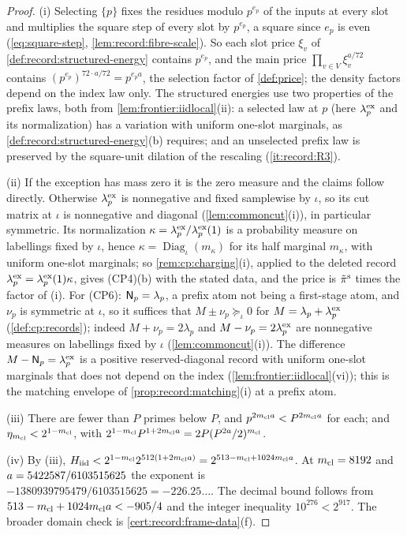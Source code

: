 \begin{proof}
(i) Selecting $\{p\}$ fixes the residues modulo $p^{e_p}$ of the inputs at every
slot and multiplies the square step of every slot by $p^{e_p}$, a square since
$e_p$ is even (\eqref{eq:square-step}, \cref{lem:record:fibre-scale}). So each slot
price $\xi_v$ of \cref{def:record:structured-energy} contains $p^{e_p}$, and the
main price $\prod_{v\in V}\xi_v^{a/72}$ contains $(p^{e_p})^{72\cdot a/72}=p^{e_pa}$,
the selection factor of \cref{def:price}; the density factors depend on the
index law only. The structured energies use two properties of the prefix
laws, both from \cref{lem:frontier:iidlocal}(ii): a selected law at $p$ (here
$\lambda^{\rm ex}_p$ and its normalization) has a variation with uniform
one-slot marginals, as \cref{def:record:structured-energy}(b) requires; and an
unselected prefix law is preserved by the square-unit dilation of the
rescaling (\ref{it:record:R3}).

(ii) If the exception has mass zero it is the zero measure and the claims
follow directly. Otherwise $\lambda^{\rm ex}_p$ is nonnegative and fixed samplewise by $\iota$, so its
cut matrix at $\iota$ is nonnegative and diagonal (\cref{lem:commoncut}(i)), in
particular symmetric. Its normalization
$\kappa=\lambda^{\rm ex}_p/\lambda^{\rm ex}_p(1)$ is a probability measure on
labellings fixed by $\iota$, hence $\kappa=\operatorname{Diag}_\iota(m_\kappa)$
for its half marginal $m_\kappa$, with uniform one-slot marginals; so
\cref{rem:cp:charging}(i), applied to the deleted record
$\lambda^{\rm ex}_p=\lambda^{\rm ex}_p(1)\kappa$, gives (CP4)(b) with the stated
data, and the price is $\tilde\pi^{\rm s}$ times the factor of (i). For (CP6):
$\mathsf N_p=\lambda_p$, a prefix atom not being a first-stage atom, and $\nu_p$ is
symmetric at $\iota$, so it suffices that $M\pm\nu_p\succeq_\iota0$ for
$M=\lambda_p+\lambda^{\rm ex}_p$ (\cref{def:cp:records}); indeed
$M+\nu_p=2\lambda_p$ and $M-\nu_p=2\lambda^{\rm ex}_p$ are nonnegative measures
on labellings fixed by $\iota$ (\cref{lem:commoncut}(i)). The difference
$M-\mathsf N_p=\lambda^{\rm ex}_p$ is a positive reserved-diagonal record with
uniform one-slot marginals that does not depend on the index
(\cref{lem:frontier:iidlocal}(vi)); this is the matching envelope of
\cref{prop:record:matching}(i) at a prefix atom.

(iii) There are fewer than $P$ primes below $P$, and $p^{2m_{\mathrm{cl}} a}<P^{2m_{\mathrm{cl}} a}$
for each; and $\eta_{m_{\mathrm{cl}}}<2^{1-m_{\mathrm{cl}}}$, with
$2^{1-m_{\mathrm{cl}}}P^{1+2m_{\mathrm{cl}} a}=2P(P^{2a}/2)^{m_{\mathrm{cl}}}$.

(iv) By (iii), $H_{\rm iid}<2^{1-m_{\mathrm{cl}}}2^{512(1+2m_{\mathrm{cl}} a)}=2^{513-m_{\mathrm{cl}}+1024m_{\mathrm{cl}} a}$.
At $m_{\mathrm{cl}}=8192$ and $a=5422587/6103515625$ the exponent is
$-1380939795479/6103515625=-226.25\ldots$. The decimal bound follows from
$513-m_{\mathrm{cl}}+1024m_{\mathrm{cl}} a<-905/4$ and the integer inequality
$10^{276}<2^{917}$. The broader domain check is
\cref{cert:record:frame-data}(f).
\end{proof}

